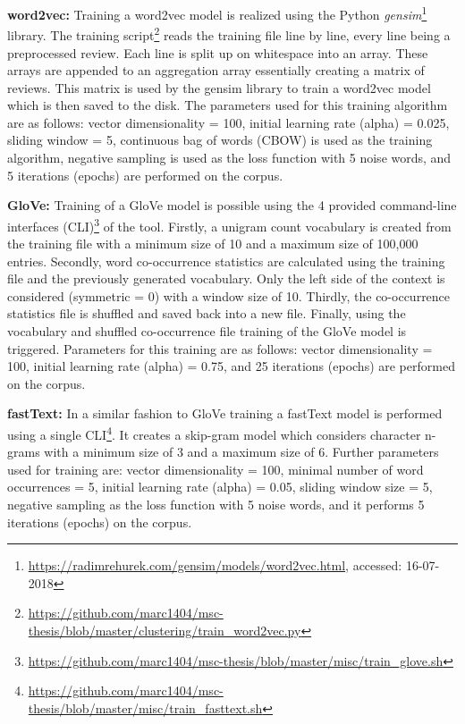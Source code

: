 \hfill

\noindent
\textbf{word2vec:} Training a word2vec model is realized using the Python \textit{gensim}\footnote{\url{https://radimrehurek.com/gensim/models/word2vec.html}, accessed: 16-07-2018} library.
The training script\footnote{\url{https://github.com/marc1404/msc-thesis/blob/master/clustering/train_word2vec.py}} reads the training file line by line, every line being a preprocessed review.
Each line is split up on whitespace into an array.
These arrays are appended to an aggregation array essentially creating a matrix of reviews.
This matrix is used by the gensim library to train a word2vec model which is then saved to the disk.
The parameters used for this training algorithm are as follows: vector dimensionality = 100, initial learning rate (alpha) = 0.025, sliding window = 5, continuous bag of words (CBOW) is used as the training algorithm, negative sampling is used as the loss function with 5 noise words, and 5 iterations (epochs) are performed on the corpus.

\hfill

\noindent
\textbf{GloVe:} Training of a GloVe model is possible using the 4 provided command-line interfaces (CLI)\footnote{\url{https://github.com/marc1404/msc-thesis/blob/master/misc/train_glove.sh}} of the tool.
Firstly, a unigram count vocabulary is created from the training file with a minimum size of 10 and a maximum size of 100,000 entries.
Secondly, word co-occurrence statistics are calculated using the training file and the previously generated vocabulary.
Only the left side of the context is considered (symmetric = 0) with a window size of 10.
Thirdly, the co-occurrence statistics file is shuffled and saved back into a new file.
Finally, using the vocabulary and shuffled co-occurrence file training of the GloVe model is triggered.
Parameters for this training are as follows: vector dimensionality = 100, initial learning rate (alpha) = 0.75, and 25 iterations (epochs) are performed on the corpus.

\hfill

\noindent
\textbf{fastText:} In a similar fashion to GloVe training a fastText model is performed using a single CLI\footnote{\url{https://github.com/marc1404/msc-thesis/blob/master/misc/train_fasttext.sh}}.
It creates a skip-gram model which considers character n-grams with a minimum size of 3 and a maximum size of 6.
Further parameters used for training are: vector dimensionality = 100, minimal number of word occurrences = 5, initial learning rate (alpha) = 0.05, sliding window size = 5, negative sampling as the loss function with 5 noise words, and it performs 5 iterations (epochs) on the corpus.

